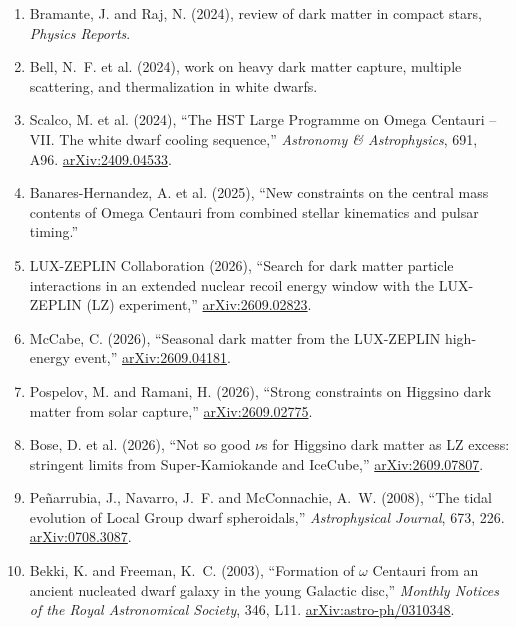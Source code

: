 \documentclass[11pt,a4paper]{article}
\begin{document}
\begin{enumerate}[leftmargin=*]
\item Bramante, J. and Raj, N. (2024),
review of dark matter in compact stars,
\emph{Physics Reports}.

\item Bell, N.~F. et al. (2024),
work on heavy dark matter capture, multiple scattering, and thermalization in white dwarfs.

\item Scalco, M. et al. (2024),
``The HST Large Programme on Omega Centauri -- VII. The white dwarf cooling sequence,''
\emph{Astronomy \& Astrophysics}, 691, A96.
\href{https://arxiv.org/abs/2409.04533}
{arXiv:2409.04533}.

\item Banares-Hernandez, A. et al. (2025),
``New constraints on the central mass contents of Omega Centauri from combined stellar kinematics and pulsar timing.''

\item LUX-ZEPLIN Collaboration (2026),
``Search for dark matter particle interactions in an extended nuclear recoil energy window with the LUX-ZEPLIN (LZ) experiment,''
\href{https://arxiv.org/abs/2609.02823}{arXiv:2609.02823}.

\item McCabe, C. (2026),
``Seasonal dark matter from the LUX-ZEPLIN high-energy event,''
\href{https://arxiv.org/abs/2609.04181}{arXiv:2609.04181}.

\item Pospelov, M. and Ramani, H. (2026),
``Strong constraints on Higgsino dark matter from solar capture,''
\href{https://arxiv.org/abs/2609.02775}{arXiv:2609.02775}.

\item Bose, D. et al. (2026),
``Not so good $\nu$s for Higgsino dark matter as LZ excess: stringent limits from Super-Kamiokande and IceCube,''
\href{https://arxiv.org/abs/2609.07807}{arXiv:2609.07807}.

\item Pe\~narrubia, J., Navarro, J.~F. and McConnachie, A.~W. (2008),
``The tidal evolution of Local Group dwarf spheroidals,''
\emph{Astrophysical Journal}, 673, 226.
\href{https://arxiv.org/abs/0708.3087}{arXiv:0708.3087}.

\item Bekki, K. and Freeman, K.~C. (2003),
``Formation of $\omega$ Centauri from an ancient nucleated dwarf galaxy in the young Galactic disc,''
\emph{Monthly Notices of the Royal Astronomical Society}, 346, L11.
\href{https://arxiv.org/abs/astro-ph/0310348}{arXiv:astro-ph/0310348}.


\end{enumerate}
\end{document}
